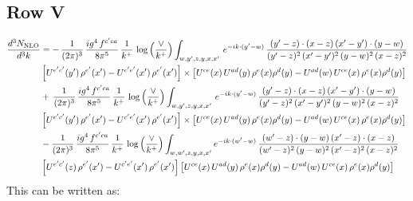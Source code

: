 \documentclass[9pt]{article}
\numberwithin{equation}{section}
\begin{document}
\subsection{Row V}
\begin{align}
    \frac{d^{3}N_{\rm NLO}}{d^{3}k} & =   -\,\frac{1}{(2\pi)^{3}}\, \frac{ig^{4}\,f^{c'ca}}{8\pi^{5}}\, \frac{1}{k^{+}}\,\log{\left(\frac{\vee}{k^{+}}\right)} \int_{w,y',z,y,x,x'}\, e^{-ik\cdot (y'-w)}\,\frac{(y'-z)\cdot (x-z)\,(x'-y')\cdot (y-w)}{(y'-z)^{2}\,(x'-y')^{2}\,(y-w)^{2}\,(x-z)^{2}}\notag \\ & \left[U^{e'c'}(y')\,\rho^{e'}(x')-U^{c'e'}(x')\,\rho^{e'}(x')\right]\times  \left[U^{ce}(x)\,U^{ad}(y)\,\rho^{e}(x)\rho^{d}(y)-U^{ad}(w)\,U^{ce}(x)\,\rho^{e}(x)\rho^{d}(y)\right] \notag \\
&   +\,\frac{1}{(2\pi)^{3}}\, \frac{ig^{4}\,f^{c'ca}}{8\pi^{5}}\, \frac{1}{k^{+}}\,\log{\left(\frac{\vee}{k^{+}}\right)} \int_{w,y',z,y,x,x'}\, e^{-ik\cdot (y'-w)}\,\frac{(y'-z)\cdot (x-z)\,(x'-y')\cdot (y-w)}{(y'-z)^{2}\,(x'-y')^{2}\,(y-w)^{2}\,(x-z)^{2}}\notag \\ &   \left[U^{e'c'}(y')\,\rho^{e'}(x')-U^{c'e'}(x')\,\rho^{e'}(x')\right]\times  \left[U^{ce}(x)\,U^{ad}(y)\,\rho^{e}(x)\rho^{d}(y)-U^{ad}(w)\,U^{ce}(x)\,\rho^{e}(x)\rho^{d}(y)\right] \notag \\
&   -\frac{1}{(2\pi)^{3}}\, \frac{ig^{4}\,f^{c'ca}}{8\pi^{5}}\, \frac{1}{k^{+}}\,\log{\left(\frac{\vee}{k^{+}}\right)}\int_{w,w',z,y,x,x'} e^{-ik\cdot (w'-w)}\,\frac{(w'-z)\cdot (y-w)\,(x'-z)\cdot (x-z)}{(w'-z)^{2}\,(y-w)^{2}\,(x'-z)^{2}\,(x-z)^{2}}\notag \\
&   \left[U^{e'c'}(z)\,\rho^{e'}(x')-U^{c'e'}(x')\,\rho^{e'}(x')\right]\left[U^{ce}(x)\,U^{ad}(y)\,\rho^{e}(x)\rho^{d}(y)-U^{ad}(w)\,U^{ce}(x)\,\rho^{e}(x)\rho^{d}(y)\right]
\end{align}
This can be written as:
\end{document}
